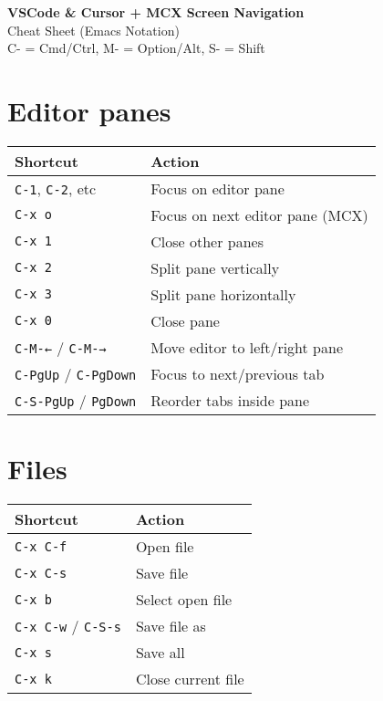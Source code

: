 \documentclass[10pt,landscape]{article}
\newcommand{\key}[1]{\textcolor{keycolor}{\texttt{#1}}}
\begin{document}
\begin{center}
{\huge\textbf{VSCode \& Cursor + MCX Screen Navigation}}\\
{\large Cheat Sheet (Emacs Notation)}\\
\vspace{0.5em}
{\small C- = Cmd/Ctrl, M- = Option/Alt, S- = Shift}
\end{center}

\vspace{0.5em}

\begin{multicols}{2}

\section*{\textcolor{sectioncolor}{Editor panes}}

\begin{tabular}{@{}p{3cm}p{6.5cm}@{}}
\toprule
\textbf{Shortcut} & \textbf{Action} \\
\midrule
\key{C-1}, \key{C-2}, etc & Focus on editor pane \\
\key{C-x o} & Focus on next editor pane (MCX) \\
\key{C-x 1} & Close other panes \\
\key{C-x 2} & Split pane vertically \\
\key{C-x 3} & Split pane horizontally \\
\key{C-x 0} & Close pane \\
\key{C-M-←} / \key{C-M-→} & Move editor to left/right pane\\
\key{C-PgUp} / \key{C-PgDown} & Focus to next/previous tab \\
\key{C-S-PgUp} / \key{PgDown} & Reorder tabs inside pane \\
\bottomrule
\end{tabular}

\section*{\textcolor{sectioncolor}{Files}}

\begin{tabular}{@{}p{3cm}p{6.5cm}@{}}
\toprule
\textbf{Shortcut} & \textbf{Action} \\
\midrule
\key{C-x C-f} & Open file \\
\key{C-x C-s} & Save file \\
\key{C-x b} & Select open file \\
\key{C-x C-w}  / \key{C-S-s} & Save file as \\
\key{C-x s} & Save all \\
\key{C-x k} & Close current file \\
\bottomrule
\end{tabular}


\end{multicols}
\end{document}
